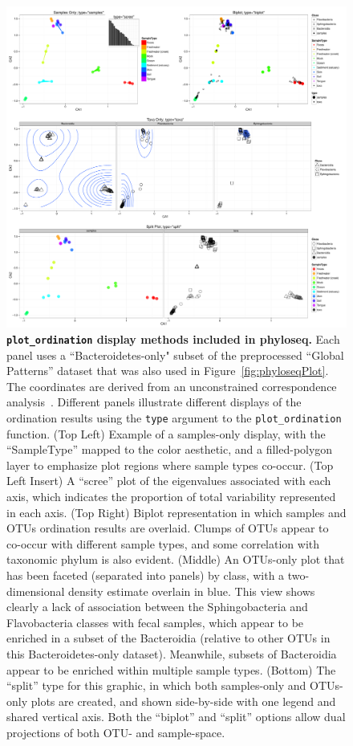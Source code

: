 \documentclass[10pt]{article}\usepackage{graphicx, color}
\newcommand{\code}[1]{{\texttt{#1}}}
\begin{document}
\FloatBarrier


\begin{figure}[!htbp]
\begin{center}
\includegraphics[width=\textwidth]{submit-main/phyloseq-plot-ordination.pdf}
\end{center}
\caption{
{\bf \code{plot{\_}ordination} display methods included in phyloseq.}
Each panel uses a ``Bacteroidetes-only" subset
of the preprocessed ``Global Patterns'' dataset
that was also used in Figure~\ref{fig:phyloseqPlot}.
The coordinates are derived from
an unconstrained correspondence analysis~\cite{greenacre2007}.
Different panels illustrate different displays
of the ordination results using the \code{type} argument
to the \code{plot{\_}ordination} function.
(Top Left) Example of a samples-only display,
with the ``SampleType'' mapped to the color aesthetic,
and a filled-polygon layer to emphasize plot regions
where sample types co-occur. 
(Top Left Insert) A ``scree'' plot of the eigenvalues
associated with each axis,
which indicates the proportion of total variability
represented in each axis. 
(Top Right) Biplot representation in which
samples and OTUs ordination results are overlaid.
Clumps of OTUs appear to co-occur with different sample types,
and some correlation with taxonomic phylum is also evident.
(Middle) An OTUs-only plot that has been faceted
(separated into panels) by class,
with a two-dimensional density estimate overlain in blue.
This view shows clearly a lack of association
between the Sphingobacteria and Flavobacteria classes
with fecal samples,
which appear to be enriched in a subset of the Bacteroidia
(relative to other OTUs in this Bacteroidetes-only dataset).
Meanwhile, subsets of Bacteroidia appear to be enriched
within multiple sample types.
(Bottom) The ``split'' type for this graphic, 
in which both samples-only and OTUs-only plots are created,
and shown side-by-side with one legend and shared vertical axis.
Both the ``biplot'' and ``split'' options allow dual projections
of both OTU- and sample-space.
}
\label{fig:plot:ordination}
\end{figure}
\end{document}
